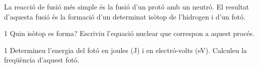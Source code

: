 La reacció de fusió més simple és la fusió d'un protó amb un neutró. El resultat d'aquesta fusió és la formació d'un determinat isòtop de l'hidrogen i d'un fotó.

\begin{apartat}{1}
Quin isòtop es forma? Escriviu l'equació nuclear que correspon a aquest procés.
\end{apartat}

\begin{apartat}{1}
Determineu l'energia del fotó en joules (J) i en electró-volts (eV). Calculeu la freqüència d'aquest fotó.
\end{apartat}

